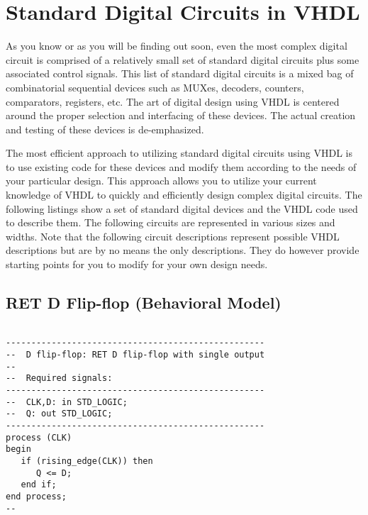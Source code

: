 %
%
%
\chapter{Standard Digital Circuits in VHDL}
As you know or as you will be finding out soon, even the most complex digital circuit is comprised of a relatively small set of standard digital circuits plus some associated control signals. This list of standard digital circuits is a mixed bag of combinatorial sequential devices such as MUXes, decoders, counters, comparators, registers, etc. The art of digital design using VHDL is centered around the proper selection and interfacing of these devices. The actual creation and testing of these devices is de-emphasized. 

The most efficient approach to utilizing standard digital circuits using VHDL is to use existing code for these devices and modify them according to the needs of your particular design. This approach allows you to utilize your current knowledge of VHDL to quickly and efficiently design complex digital circuits. The following listings show a set of standard digital devices and the VHDL code used to describe them. The following circuits are represented in various sizes and widths. Note that the following circuit descriptions represent possible VHDL descriptions but are by no means the only descriptions. They do however provide starting points for you to modify for your own design needs. 

\section{RET D Flip-flop (Behavioral Model)}

\noindent
\begin{minipage}{0.99\linewidth}
\begin{lstlisting}

---------------------------------------------------
--  D flip-flop: RET D flip-flop with single output
--
--  Required signals: 
---------------------------------------------------
--  CLK,D: in STD_LOGIC;
--  Q: out STD_LOGIC;
---------------------------------------------------
process (CLK) 
begin
   if (rising_edge(CLK)) then  
      Q <= D;
   end if;
end process;
--
\end{lstlisting}
\end{minipage}

